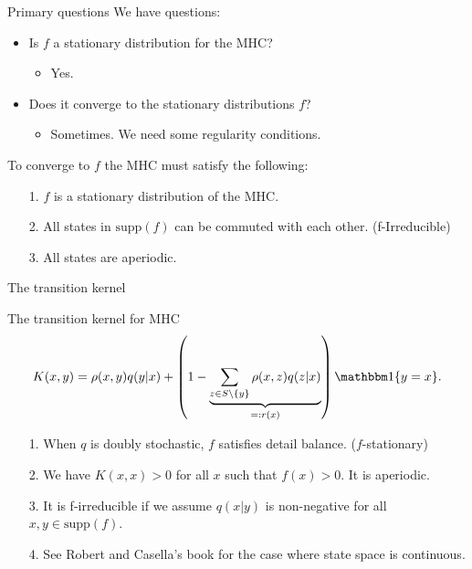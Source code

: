 \documentclass[11pt]{beamer}
\begin{document}
    \begin{frame}{Primary questions}
        We have questions: 
        \begin{itemize}
            \item Is $f$ a stationary distribution for the MHC? 
                \begin{itemize}
                    \item Yes. 
                \end{itemize}
            \item Does it converge to the stationary distributions $f$? 
            \begin{itemize}
                \item Sometimes. We need some regularity conditions. 
            \end{itemize}
        \end{itemize}
        \vspace{2em}
        To converge to $f$ the MHC must satisfy the following: 
        \begin{itemize}
            \item [1.] $f$ is a stationary distribution of the MHC. 
            \item [2.] All states in $\text{supp}(f)$ can be commuted with each other. (f-Irreducible)
            \item [3.] All states are aperiodic. 
        \end{itemize}
    \end{frame}
    \begin{frame}{The transition kernel}
        \begin{block}{The transition kernel for MHC}
            \begin{align*}
                K(x, y) = 
                \rho(x, y)q(y|x) + 
                \left(
                    1 - \underbrace{\sum_{z \in S\setminus \{y\} }^{}\rho(x, z)q(z|x)}_{=:r(x)}
                \right) \mathbbm 1\{y = x\}. 
            \end{align*}
        \end{block}
        \begin{itemize}
            \item [1.] When $q$ is doubly stochastic, $f$ satisfies detail balance. ($f$-stationary)
            \item [2.] We have $K(x,x)> 0$ for all $x$ such that $f(x) > 0$. It is aperiodic. 
            \item [3.] It is f-irreducible if we assume $q(x|y)$ is non-negative for all $x, y\in \text{supp}(f)$. 
            \item [4.] See Robert and Casella's book \cite{book:robert_casella_2005} for the case where state space is continuous. 
        \end{itemize}
    \end{frame}
\end{document}
